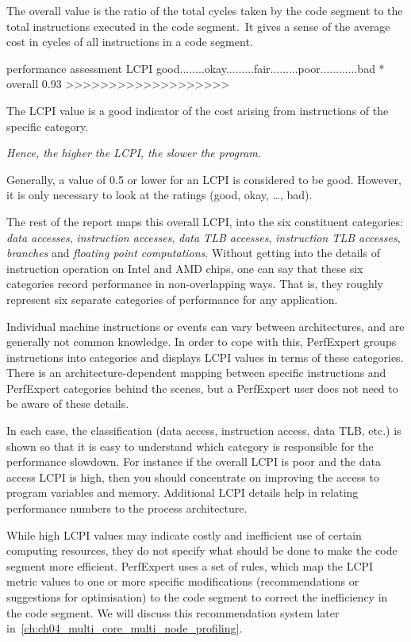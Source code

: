 The overall value is the ratio of the total cycles taken by the code segment to the total instructions executed in the code segment.~It gives a sense of the average cost in cycles of all instructions in a code segment.

\begin{prompt}
performance assessment  LCPI good........okay.........fair.........poor............bad
* overall               0.93 >>>>>>>>>>>>>>>>>>>
\end{prompt}

The LCPI value is a good indicator of the cost arising from instructions of the specific category.

\emph{Hence, the higher the LCPI, the slower the program.}

Generally, a value of 0.5 or lower for an LCPI is considered to be good. However, it is only necessary to look at the ratings (good, okay, \ldots, bad).

The rest of the report maps this overall LCPI, into the six constituent categories: \emph{data accesses}, \emph{instruction accesses}, \emph{data TLB accesses}, \emph{instruction TLB accesses}, \emph{branches} and \emph{floating point computations}. Without getting into the details of instruction operation on Intel and AMD chips, one can say that these six categories record performance in non-overlapping ways. That is, they roughly represent six separate categories of performance for any application.

Individual machine instructions or events can vary between architectures, and are generally not common knowledge. In order to cope with this, PerfExpert groups instructions into categories and displays LCPI values in terms of these categories. There is an architecture-dependent mapping between specific instructions and PerfExpert categories behind the scenes, but a PerfExpert user does not need to be aware of these details.


In each case, the classification (data access, instruction access, data TLB, etc.) is shown so that it is easy to understand which category is responsible for the performance slowdown. For instance if the overall LCPI is poor and the data access LCPI is high, then you should concentrate on improving the access to program variables and memory. Additional LCPI details help in relating performance numbers to the process architecture.

While high LCPI values may indicate costly and inefficient use of certain computing resources, they do not specify what should be done to make the code segment more efficient. PerfExpert uses a set of rules, which map the LCPI metric values to one or more specific modifications (recommendations or suggestions for optimisation) to the code segment to correct the inefficiency in the code segment. We will discuss this recommendation system later in~\autoref{ch:ch04_multi_core_multi_node_profiling}.

